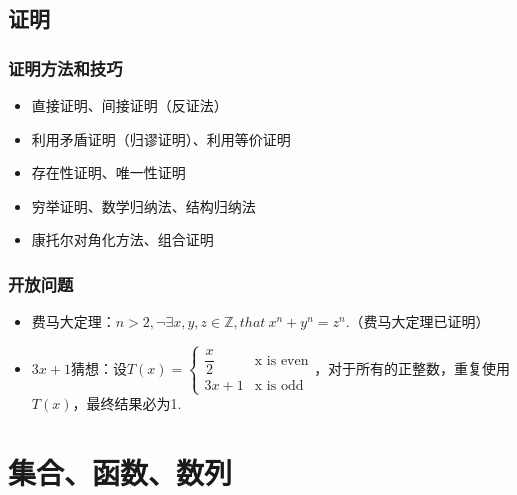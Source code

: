 
\subsection{证明}
\subsubsection*{证明方法和技巧}
\begin{itemize}
    \item 直接证明、间接证明（反证法）
    \item 利用矛盾证明（归谬证明）、利用等价证明
    \item 存在性证明、唯一性证明
    \item 穷举证明、数学归纳法、结构归纳法
    \item 康托尔对角化方法、组合证明
\end{itemize}

\subsubsection*{开放问题}
\begin{itemize}
    \item 费马大定理：$n > 2, \lnot \exists x,y,z \in \mathbb{Z}, that \ x^n + y^n = z^n$.（费马大定理已证明）
    \item $3x+1$猜想：设$T(x) = \begin{cases} \dfrac x2 & \text{x is even} \\ 3x+1 & \text{x is odd} \end{cases}$，对于所有的正整数，重复使用$T(x)$，最终结果必为1.
\end{itemize}

\section{集合、函数、数列}


